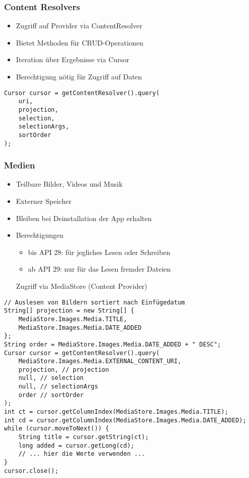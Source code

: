 \subsubsection{Content Resolvers}
\begin{itemize}[topsep=0pt, leftmargin=4mm]
    \setlength\itemsep{-0.3em}
    \item Zugriff auf Provider via ContentResolver
    \item Bietet Methoden für CRUD-Operationen
    \item Iteration über Ergebnisse via Cursor
    \item Berechtigung nötig für Zugriff auf Daten
\end{itemize}
\begin{lstlisting}
Cursor cursor = getContentResolver().query(
    uri,
    projection,
    selection,
    selectionArgs,
    sortOrder
);
\end{lstlisting}
\subsubsection{Medien}
\begin{itemize}[topsep=0pt, leftmargin=4mm]
    \setlength\itemsep{-0.3em}
    \item Teilbare Bilder, Videos und Musik
    \item Externer Speicher
    \item Bleiben bei Deinstallation der App erhalten
    \item Berechtigungen
    \begin{itemize}[topsep=0pt, leftmargin=4mm]
        \setlength\itemsep{-0.3em}
        \item bis API 28: für jegliches Lesen oder Schreiben
        \item ab API 29: nur für das Lesen fremder Dateien
    \end{itemize}
    Zugriff via MediaStore (Content Provider)
\end{itemize}
\begin{lstlisting}
// Auslesen von Bildern sortiert nach Einfügedatum
String[] projection = new String[] {
    MediaStore.Images.Media.TITLE,
    MediaStore.Images.Media.DATE_ADDED
};
String order = MediaStore.Images.Media.DATE_ADDED + " DESC";
Cursor cursor = getContentResolver().query(
    MediaStore.Images.Media.EXTERNAL_CONTENT_URI,
    projection, // projection
    null, // selection
    null, // selectionArgs
    order // sortOrder
);
int ct = cursor.getColumnIndex(MediaStore.Images.Media.TITLE);
int cd = cursor.getColumnIndex(MediaStore.Images.Media.DATE_ADDED);
while (cursor.moveToNext()) {
    String title = cursor.getString(ct);
    long added = cursor.getLong(cd);
    // ... hier die Werte verwenden ...
}
cursor.close();
\end{lstlisting}
